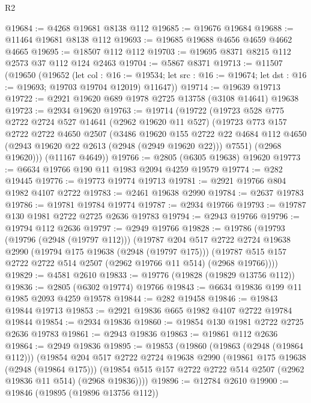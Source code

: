 \begin{lexlean}{R2}
\begin{coremodule}
@19684 := @4268 @19681 @8138 @112
@19685 := @19676 @19684
@19688 := @11464 @19681 @8138 @112
@19693 := @19685 @19688 @4656 @4659 @4662 @4665
@19695 := @18507 @112 @112
@19703 := @19695 @8371 @8215 @112 @2573 @37 @112 @124 @2463
@19704 := @5867 @8371
@19713 := @11507
    (@19650
      (@19652
        (let col : @16 := @19534;
        let src : @16 := @19674; let dst : @16 := @19693; @19703 @19704 @12019)
        @11647))
@19714 := @19639 @19713
@19722 := @2921 @19620 @689 @1978 @2725 @13758 (@3108 @14641) @19638
@19723 := @2934 @19620
@19763 := @19714
    (@19722
      (@19723
        @528
        @775
        @2722
        @2724
        @527
        @14641
        (@2962 @19620 @11 @527)
        (@19723
          @773
          @157
          @2722
          @2722
          @4650
          @2507
          (@3486
            @19620
            @155
            @2722
            @22
            @4684
            @112
            @4650
            (@2943 @19620 @22 @2613 (@2948 (@2949 @19620 @22)))
            @7551)
          (@2968 @19620)))
      (@11167 @4649))
@19766 := @2805 (@6305 @19638) @19620
@19773 := @6634 @19766 @190 @11 @1983 @2094 @4259 @19579
@19774 := @282 @19445
@19776 := @19773 @19774 @19713
@19781 := @2921 @19766 @804 @1982 @4107 @2722
@19783 := @2461 @19638 @2990
@19784 := @2637 @19783
@19786 := @19781 @19784 @19774
@19787 := @2934 @19766
@19793 := @19787 @130 @1981 @2722 @2725 @2636 @19783
@19794 := @2943 @19766
@19796 := @19794 @112 @2636
@19797 := @2949 @19766
@19828 := @19786
    (@19793
      (@19796 (@2948 (@19797 @112)))
      (@19787
        @204
        @517
        @2722
        @2724
        @19638
        @2990
        (@19794 @175 @19638 (@2948 (@19797 @175)))
        (@19787 @515 @157 @2722 @2722 @514 @2507 (@2962 @19766 @11 @514) (@2968 @19766))))
@19829 := @4581 @2610
@19833 := @19776 (@19828 (@19829 @13756 @112))
@19836 := @2805 (@6302 @19774) @19766
@19843 := @6634 @19836 @199 @11 @1985 @2093 @4259 @19578
@19844 := @282 @19458
@19846 := @19843 @19844 @19713
@19853 := @2921 @19836 @665 @1982 @4107 @2722 @19784 @19844
@19854 := @2934 @19836
@19860 := @19854 @130 @1981 @2722 @2725 @2636 @19783
@19861 := @2943 @19836
@19863 := @19861 @112 @2636
@19864 := @2949 @19836
@19895 := @19853
    (@19860
      (@19863 (@2948 (@19864 @112)))
      (@19854
        @204
        @517
        @2722
        @2724
        @19638
        @2990
        (@19861 @175 @19638 (@2948 (@19864 @175)))
        (@19854 @515 @157 @2722 @2722 @514 @2507 (@2962 @19836 @11 @514) (@2968 @19836))))
@19896 := @12784 @2610
@19900 := @19846 (@19895 (@19896 @13756 @112))

\end{coremodule}
\end{lexlean}
